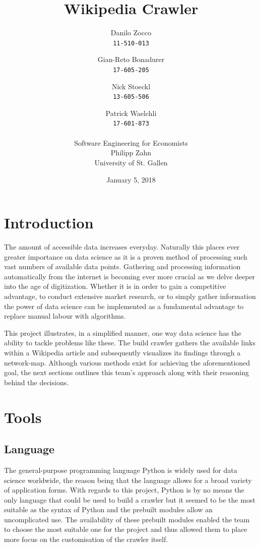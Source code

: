 \documentclass[10pt]{article}
\title{Wikipedia Crawler}
\author{Danilo Zocco\\ \texttt{11-510-013}
	\and Gian-Reto Bonadurer\\ \texttt{17-605-205}
	\and Nick Stoeckl\\ \texttt{13-605-506}
	\and Patrick Waelchli\\ \texttt{17-601-873}\\ \\
	\large Software Engineering for Economists\\
	\large Philipp Zahn\\
	\large University of St. Gallen}
\date{January 5, 2018}
\begin{document}
\maketitle
\newpage

\tableofcontents
\listoffigures
\newpage


\section{Introduction}

The amount of accessible data increases everyday. Naturally this places ever greater importance on data science as it is a proven method of processing such vast numbers of available data points. \cite{dat} Gathering and processing information automatically from 
the internet is becoming ever more crucial as we delve deeper into the age of digitization. Whether it is in order to gain a competitive advantage, to conduct extensive market research, or to simply gather information the power of data science can be implemented as a fundamental advantage to replace manual labour with algorithms. \par
 \noindent This project illustrates, in a simplified manner, one way data science has the ability to tackle problems like these. The build crawler gathers the available links within a Wikipedia article and subsequently visualizes its findings through a network-map. Although various methods exist for achieving the aforementioned goal, the next sections outlines this team's approach along with their reasoning behind the decisions.

\section{Tools}	
	\subsection{Language}

The general-purpose programming language Python is widely used for data science worldwide, the reason being that the language allows for a broad variety of application forms. \cite{pyt} With regards to this project, Python is by no means the only language that could be used to build a crawler but it seemed to be the most suitable as the syntax of Python and the prebuilt modules allow an uncomplicated use. The availability of these prebuilt modules enabled the team to choose the most suitable one for the project and thus allowed them to place more focus on the customisation of the crawler itself. \par 
 
\end{document}
